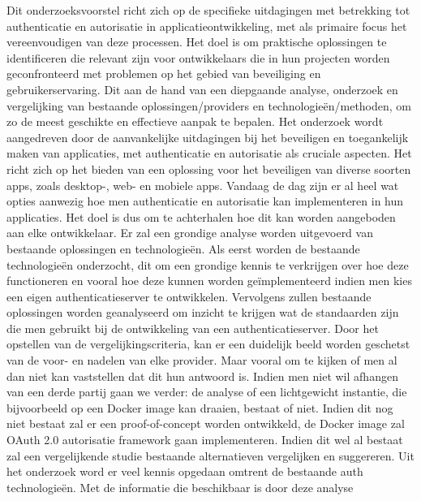 Dit onderzoeksvoorstel richt zich op de specifieke uitdagingen met betrekking tot authenticatie en autorisatie in applicatieontwikkeling, met als primaire 
focus het vereenvoudigen van deze processen. Het doel is om praktische oplossingen te identificeren die relevant zijn voor ontwikkelaars 
die in hun projecten worden geconfronteerd met problemen op het gebied van beveiliging en gebruikerservaring. Dit aan de hand van een diepgaande analyse,
onderzoek en vergelijking van bestaande oplossingen/providers en technologieën/methoden, om zo de meest geschikte en effectieve aanpak te bepalen. 
\newline
\newline
Het onderzoek wordt aangedreven door de aanvankelijke uitdagingen bij het beveiligen en toegankelijk maken van applicaties, met authenticatie en 
autorisatie als cruciale aspecten. Het richt zich op het bieden van een oplossing voor het beveiligen van diverse soorten apps, zoals desktop-, 
web- en mobiele apps. Vandaag de dag zijn er al heel wat opties aanwezig hoe men authenticatie en autorisatie kan implementeren in hun applicaties.
Het doel is dus om te achterhalen hoe dit kan worden aangeboden aan elke ontwikkelaar.
\newline
\newline
Er zal een grondige analyse worden uitgevoerd van bestaande oplossingen en technologieën. Als eerst worden de bestaande technologieën onderzocht,
dit om een grondige kennis te verkrijgen over hoe deze functioneren en vooral hoe deze kunnen worden geïmplementeerd indien men kies een eigen
authenticatieserver te ontwikkelen. Vervolgens zullen bestaande oplossingen worden geanalyseerd om inzicht te krijgen wat de standaarden zijn die
men gebruikt bij de ontwikkeling van een authenticatieserver. 
Door het opstellen van de vergelijkingscriteria, kan er een duidelijk beeld worden geschetst van de voor- en nadelen van elke provider.
Maar vooral om te kijken of men al dan niet kan vaststellen dat dit hun antwoord is.
Indien men niet wil afhangen van een derde partij gaan we verder: de analyse of een lichtgewicht instantie, die bijvoorbeeld op een Docker image
kan draaien, bestaat of niet. Indien dit nog niet bestaat zal er een proof-of-concept worden ontwikkeld, de Docker image zal OAuth 2.0
autorisatie framework gaan implementeren. Indien dit wel al bestaat zal een vergelijkende studie bestaande alternatieven vergelijken en suggereren.
\newline
\newline
Uit het onderzoek word er veel kennis opgedaan omtrent de bestaande auth technologieën. Met de informatie die beschikbaar is door deze analyse
